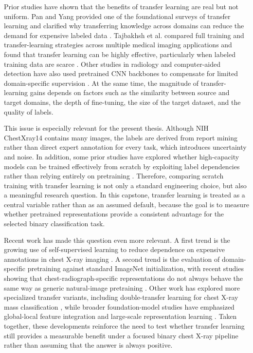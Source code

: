 Prior studies have shown that the benefits of transfer learning are real but not uniform. Pan and Yang provided one of the foundational surveys of transfer learning and clarified why transferring knowledge across domains can reduce the demand for expensive labeled data \cite{ref:pan2010}. Tajbakhsh et al. compared full training and transfer-learning strategies across multiple medical imaging applications and found that transfer learning can be highly effective, particularly when labeled training data are scarce \cite{ref:tajbakhsh2016}. Other studies in radiology and computer-aided detection have also used pretrained CNN backbones to compensate for limited domain-specific supervision \cite{ref:shin2016}. At the same time, the magnitude of transfer-learning gains depends on factors such as the similarity between source and target domains, the depth of fine-tuning, the size of the target dataset, and the quality of labels.

This issue is especially relevant for the present thesis. Although NIH ChestXray14 contains many images, the labels are derived from report mining rather than direct expert annotation for every task, which introduces uncertainty and noise. In addition, some prior studies have explored whether high-capacity models can be trained effectively from scratch by exploiting label dependencies rather than relying entirely on pretraining \cite{ref:yao2017}. Therefore, comparing scratch training with transfer learning is not only a standard engineering choice, but also a meaningful research question. In this capstone, transfer learning is treated as a central variable rather than as an assumed default, because the goal is to measure whether pretrained representations provide a consistent advantage for the selected binary classification task.

Recent work has made this question even more relevant. A first trend is the growing use of self-supervised learning to reduce dependence on expensive annotations in chest X-ray imaging \cite{ref:imagawa2024,ref:chu2025ssl}. A second trend is the evaluation of domain-specific pretraining against standard ImageNet initialization, with recent studies showing that chest-radiograph-specific representations do not always behave the same way as generic natural-image pretraining \cite{ref:yuan2025}. Other work has explored more specialized transfer variants, including double-transfer learning for chest X-ray mass classification \cite{ref:fujiya2025}, while broader foundation-model studies have emphasized global-local feature integration and large-scale representation learning \cite{ref:yang2025foundation}. Taken together, these developments reinforce the need to test whether transfer learning still provides a measurable benefit under a focused binary chest X-ray pipeline rather than assuming that the answer is always positive.

